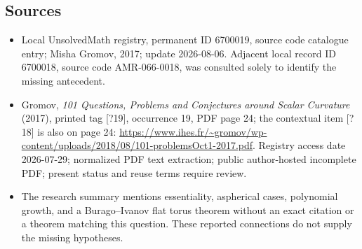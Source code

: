 \documentclass[11pt]{article}
\begin{document}
\subsection{Sources}
\begin{itemize}
\item Local UnsolvedMath registry, permanent ID 6700019, source code catalogue entry; Misha Gromov, 2017; update 2026-08-06. Adjacent local record ID 6700018, source code AMR-066-0018, was consulted solely to identify the missing antecedent.
\item Gromov, \emph{101 Questions, Problems and Conjectures around Scalar Curvature} (2017), printed tag [?19], occurrence 19, PDF page 24; the contextual item [?18] is also on page 24: \url{https://www.ihes.fr/~gromov/wp-content/uploads/2018/08/101-problemsOct1-2017.pdf}. Registry access date 2026-07-29; normalized PDF text extraction; public author-hosted incomplete PDF; present status and reuse terms require review.
\item The research summary mentions essentiality, aspherical cases, polynomial growth, and a Burago--Ivanov flat torus theorem without an exact citation or a theorem matching this question. These reported connections do not supply the missing hypotheses.
\end{itemize}
\end{document}
